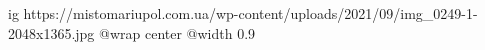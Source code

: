  
 
 
 
 

\ifcmt
  ig https://mistomariupol.com.ua/wp-content/uploads/2021/09/img_0249-1-2048x1365.jpg
  @wrap center
  @width 0.9
\fi
